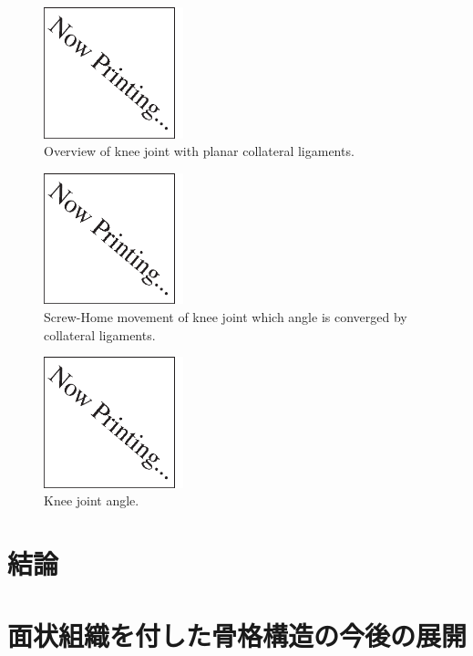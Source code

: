 \documentclass{jarticle}
\begin{document}
\begin{figure}[tb]
 \centering
  \includegraphics[height=38mm]{figs/nowprinting.eps}
  \vspace*{-4mm}
  \caption{Overview of knee joint with planar collateral ligaments.}
  \label{fig:ovv-knee}
\end{figure}

\begin{figure}[tb]
 \centering
  \includegraphics[height=38mm]{figs/nowprinting.eps}
  \vspace*{-4mm}
  \caption{Screw-Home movement of knee joint which angle is converged by collateral ligaments.}
  \label{fig:shm}
\end{figure}

\begin{figure}[tb]
 \centering
  \includegraphics[height=38mm]{figs/nowprinting.eps}
  \vspace*{-4mm}
  \caption{Knee joint angle.}
  \label{fig:shm-graph}
\end{figure}

\section{結論}

\section{面状組織を付した骨格構造の今後の展開}

\footnotesize



\normalsize
\end{document}
